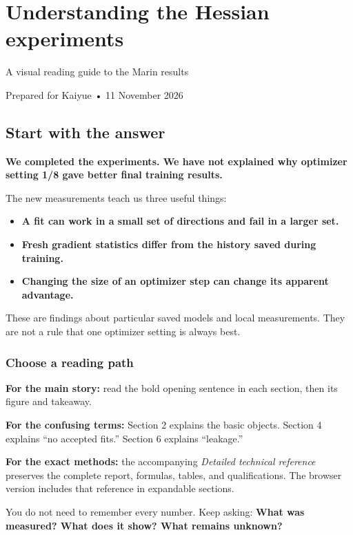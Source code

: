 \documentclass[
  14pt,
  letterpaper,
]{extarticle}
\author{}
\date{}
\providecommand{\tightlist}{%
  \setlength{\itemsep}{0pt}\setlength{\parskip}{0pt}}
\let\reportsubsubsection\subsubsection
\renewcommand{\subsubsection}{\Needspace{5\baselineskip}\reportsubsubsection}
\begin{document}
\section{Understanding the Hessian
experiments}\label{understanding-the-hessian-experiments}

A visual reading guide to the Marin results

Prepared for Kaiyue • 11 November 2026

\subsection{Start with the answer}\label{start-with-the-answer}

\textbf{We completed the experiments. We have not explained why
optimizer setting 1/8 gave better final training results.}

The new measurements teach us three useful things:

\begin{itemize}
\tightlist
\item
  \textbf{A fit can work in a small set of directions and fail in a
  larger set.}
\item
  \textbf{Fresh gradient statistics differ from the history saved during
  training.}
\item
  \textbf{Changing the size of an optimizer step can change its apparent
  advantage.}
\end{itemize}

These are findings about particular saved models and local measurements.
They are not a rule that one optimizer setting is always best.

\subsubsection{Choose a reading path}\label{choose-a-reading-path}

\textbf{For the main story:} read the bold opening sentence in each
section, then its figure and takeaway.

\textbf{For the confusing terms:} Section 2 explains the basic objects.
Section 4 explains ``no accepted fits.'' Section 6 explains ``leakage.''

\textbf{For the exact methods:} the accompanying \emph{Detailed
technical reference} preserves the complete report, formulas, tables,
and qualifications. The browser version includes that reference in
expandable sections.

You do not need to remember every number. Keep asking: \textbf{What was
measured? What does it show? What remains unknown?}
\end{document}
